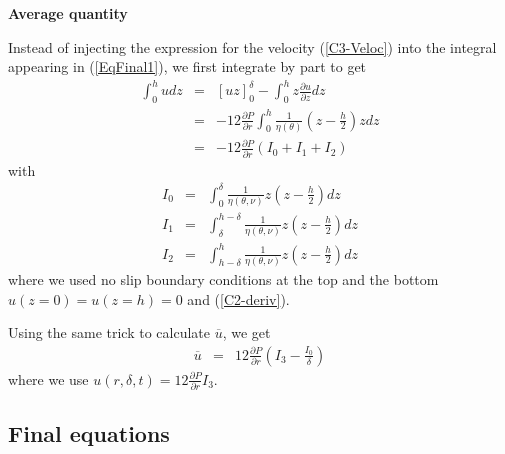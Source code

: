   \vspace{.5cm} \textbf{Average quantity} \vspace{.5cm}

  Instead   of    injecting   the   expression   for    the   velocity
  (\ref{C3-Veloc}) into the integral appearing in (\ref{EqFinal1}), we
  first integrate by part to get
\begin{eqnarray}
\int_0^h      udz&=&   [    uz   ]_{0}^{\delta}    -\int_0^h
                                                                           z\frac{\partial
                     u}{\partial z} dz \\
&=&-12\frac{\partial      P}{\partial      r}\int_0^h
                \frac{1}{\eta(\theta)}\left(z-\frac{h}{2}\right)z dz\\
&=&-12\frac{\partial      P}{\partial      r}\left(I_0+I_1+I_2\right)
\end{eqnarray}
with
\begin{eqnarray}
I_0&=&\int_0^\delta\frac{1}{\eta(\theta,\nu)}z \left(z-\frac{h}{2}\right)dz\\
I_1&=&\int_\delta^{h-\delta}\frac{1}{\eta(\theta,\nu)}z \left(z-\frac{h}{2}\right)dz\\
I_2&=&\int_{h-\delta}^h\frac{1}{\eta(\theta,\nu)}z \left(z-\frac{h}{2}\right)dz
\end{eqnarray}
where we used no slip boundary conditions at the top and the bottom
$u(z=0)=u(z=h)=0$ and (\ref{C2-deriv}).

Using the same trick to calculate $\overline{u}$, we get
\begin{eqnarray}
\overline{u}&=& 12\frac{\partial  P}{\partial r}\left(I_3-\frac{I_0}{\delta}\right)
\end{eqnarray}
where we use $u(r,\delta,t) = 12 \frac{\partial P}{\partial      r}I_3$.


  \subsection{Final equations}

